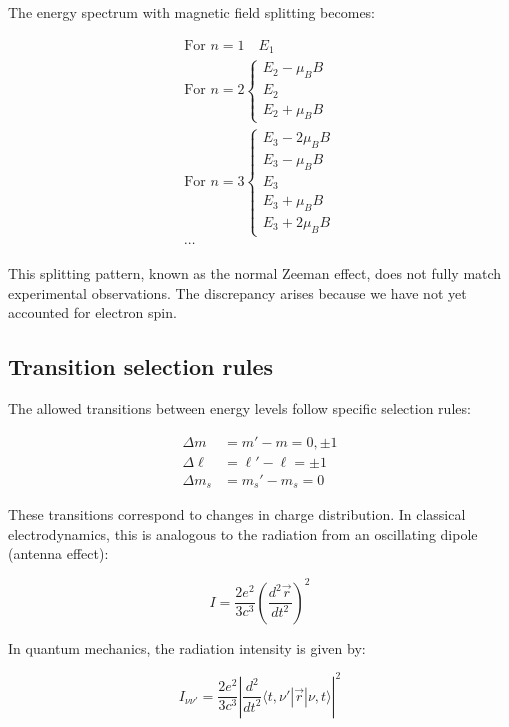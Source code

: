 \documentclass[italian]{HKNdocument}
\begin{document}
The energy spectrum with magnetic field splitting becomes:

\begin{gather}
\text{For } n=1 \quad E_1 \\
\text{For } n=2\left\{\begin{array}{l}
E_2-\mu_B B \\
E_2 \\
E_2+\mu_B B
\end{array}\right. \\
\text{For } n=3\left\{\begin{array}{l}
E_3-2\mu_B B \\
E_3-\mu_B B \\
E_3 \\
E_3+\mu_B B \\
E_3+2\mu_B B
\end{array}\right. \label{eq:12.26}\\
\cdots
\end{gather}

This splitting pattern, known as the normal Zeeman effect, does not fully match experimental observations. The discrepancy arises because we have not yet accounted for electron spin.

\subsection{Transition selection rules}
The allowed transitions between energy levels follow specific selection rules:

\begin{align}
\Delta m &= m'-m=0,\pm 1 \\
\Delta\ell &= \ell'-\ell=\pm 1 \label{eq:12.27}\\
\Delta m_s &= m_s'-m_s=0
\end{align}

These transitions correspond to changes in charge distribution. In classical electrodynamics, this is analogous to the radiation from an oscillating dipole (antenna effect):

\begin{equation}
I=\frac{2e^2}{3c^3}\left(\frac{d^2\vec{r}}{dt^2}\right)^2 \label{eq:12.28}
\end{equation}


In quantum mechanics, the radiation intensity is given by:

\begin{equation}
I_{\nu\nu'}=\frac{2e^2}{3c^3}\left|\frac{d^2}{dt^2}\langle t,\nu'|\vec{r}|\nu,t\rangle\right|^2 \label{eq:12.29}
\end{equation}
\end{document}
